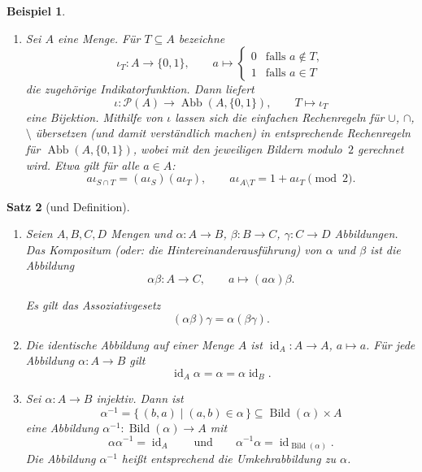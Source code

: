 \documentclass[a4paper]{article}
\theoremstyle{kurzskript}
\newtheorem{satz}{Satz}[section]             %
\newtheorem{beispiel}[satz]{Beispiel}
\newcommand{\Pot}{\mathcal{P}}
\begin{document}
\begin{beispiel}
\begin{enumerate}[label=(\alph*)]
  \item Sei $A$ eine Menge. Für $T \subseteq A$ bezeichne
  \[
    \iota_T\colon A \to \{0, 1\}, \qquad a \mapsto
    \begin{cases}
      0 & \text{falls } a \notin T,\\
      1 & \text{falls } a \in T
    \end{cases}
  \]
  die zugehörige \emph{Indikatorfunktion}. Dann liefert
  \[
    \iota\colon \Pot(A) \to \operatorname{Abb}(A, \{0, 1\}), \qquad T \mapsto \iota_T
  \]
  eine Bijektion. Mithilfe von $\iota$ lassen sich die einfachen \glqq Rechenregeln\grqq{} für $\cup$, $\cap$, $\setminus$ übersetzen (und damit verständlich machen) in entsprechende Rechenregeln für $\operatorname{Abb}(A, \{0, 1\})$, wobei mit den jeweiligen Bildern modulo~$2$ gerechnet wird. Etwa gilt für alle $a \in A$:
  \[
    a\iota_{S \cap T} = (a\iota_S)(a\iota_T), \qquad a\iota_{A \setminus T} = 1 + a\iota_T \pmod 2.
  \]
\end{enumerate}
\end{beispiel}

\begin{satz}[und Definition]
\leavevmode
\begin{enumerate}[label=(\alph*)]
  \item Seien $A, B, C, D$ Mengen und $\alpha\colon A \to B$, $\beta\colon B \to C$, $\gamma\colon C \to D$ Abbildungen. Das \emph{Kompositum} (oder: die \emph{Hintereinanderausführung}) von $\alpha$ und $\beta$ ist die Abbildung
  \[
    \alpha\beta\colon A \to C, \qquad a \mapsto (a\alpha)\beta.
  \]
  \begin{center}
  \end{center}
  Es gilt das \emph{Assoziativgesetz}
  \[
    (\alpha\beta)\gamma = \alpha(\beta\gamma).
  \]
  \item Die \emph{identische Abbildung} auf einer Menge $A$ ist $\operatorname{id}_A\colon A \to A$, $a \mapsto a$. Für jede Abbildung $\alpha\colon A \to B$ gilt
  \[
    \operatorname{id}_A \alpha = \alpha = \alpha \operatorname{id}_B.
  \]
  \item Sei $\alpha\colon A \to B$ injektiv. Dann ist
  \[
    \alpha^{-1} = \{\, (b, a) \mid (a, b) \in \alpha \,\} \subseteq \operatorname{Bild}(\alpha) \times A
  \]
  eine Abbildung $\alpha^{-1}\colon \operatorname{Bild}(\alpha) \to A$ mit
  \[
    \alpha\alpha^{-1} = \operatorname{id}_A \qquad\text{und}\qquad \alpha^{-1}\alpha = \operatorname{id}_{\operatorname{Bild}(\alpha)}.
  \]
  Die Abbildung $\alpha^{-1}$ heißt entsprechend die \emph{Umkehrabbildung} zu $\alpha$.
\end{enumerate}
\end{satz}
\end{document}
